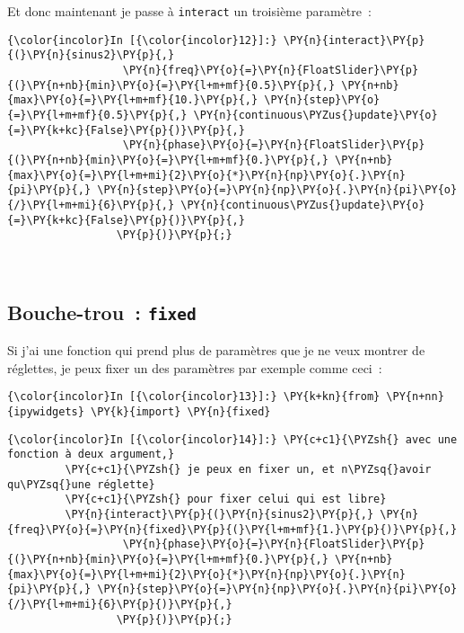     Et donc maintenant je passe à \texttt{interact} un troisième paramètre~:

    \begin{Verbatim}[commandchars=\\\{\}]
{\color{incolor}In [{\color{incolor}12}]:} \PY{n}{interact}\PY{p}{(}\PY{n}{sinus2}\PY{p}{,}
                  \PY{n}{freq}\PY{o}{=}\PY{n}{FloatSlider}\PY{p}{(}\PY{n+nb}{min}\PY{o}{=}\PY{l+m+mf}{0.5}\PY{p}{,} \PY{n+nb}{max}\PY{o}{=}\PY{l+m+mf}{10.}\PY{p}{,} \PY{n}{step}\PY{o}{=}\PY{l+m+mf}{0.5}\PY{p}{,} \PY{n}{continuous\PYZus{}update}\PY{o}{=}\PY{k+kc}{False}\PY{p}{)}\PY{p}{,}
                  \PY{n}{phase}\PY{o}{=}\PY{n}{FloatSlider}\PY{p}{(}\PY{n+nb}{min}\PY{o}{=}\PY{l+m+mf}{0.}\PY{p}{,} \PY{n+nb}{max}\PY{o}{=}\PY{l+m+mi}{2}\PY{o}{*}\PY{n}{np}\PY{o}{.}\PY{n}{pi}\PY{p}{,} \PY{n}{step}\PY{o}{=}\PY{n}{np}\PY{o}{.}\PY{n}{pi}\PY{o}{/}\PY{l+m+mi}{6}\PY{p}{,} \PY{n}{continuous\PYZus{}update}\PY{o}{=}\PY{k+kc}{False}\PY{p}{)}\PY{p}{,}
                 \PY{p}{)}\PY{p}{;}
\end{Verbatim}


    \begin{center}
    \end{center}
    { \hspace*{\fill} \\}
    
    \hypertarget{bouche-trou-fixed}{%
\subsection{\texorpdfstring{Bouche-trou~:
\texttt{fixed}}{Bouche-trou~: fixed}}\label{bouche-trou-fixed}}

    Si j'ai une fonction qui prend plus de paramètres que je ne veux montrer
de réglettes, je peux fixer un des paramètres par exemple comme ceci~:

    \begin{Verbatim}[commandchars=\\\{\}]
{\color{incolor}In [{\color{incolor}13}]:} \PY{k+kn}{from} \PY{n+nn}{ipywidgets} \PY{k}{import} \PY{n}{fixed}
\end{Verbatim}


    \begin{Verbatim}[commandchars=\\\{\}]
{\color{incolor}In [{\color{incolor}14}]:} \PY{c+c1}{\PYZsh{} avec une fonction à deux argument,}
         \PY{c+c1}{\PYZsh{} je peux en fixer un, et n\PYZsq{}avoir qu\PYZsq{}une réglette}
         \PY{c+c1}{\PYZsh{} pour fixer celui qui est libre}
         \PY{n}{interact}\PY{p}{(}\PY{n}{sinus2}\PY{p}{,} \PY{n}{freq}\PY{o}{=}\PY{n}{fixed}\PY{p}{(}\PY{l+m+mf}{1.}\PY{p}{)}\PY{p}{,}
                  \PY{n}{phase}\PY{o}{=}\PY{n}{FloatSlider}\PY{p}{(}\PY{n+nb}{min}\PY{o}{=}\PY{l+m+mf}{0.}\PY{p}{,} \PY{n+nb}{max}\PY{o}{=}\PY{l+m+mi}{2}\PY{o}{*}\PY{n}{np}\PY{o}{.}\PY{n}{pi}\PY{p}{,} \PY{n}{step}\PY{o}{=}\PY{n}{np}\PY{o}{.}\PY{n}{pi}\PY{o}{/}\PY{l+m+mi}{6}\PY{p}{)}\PY{p}{,}
                 \PY{p}{)}\PY{p}{;}
\end{Verbatim}


